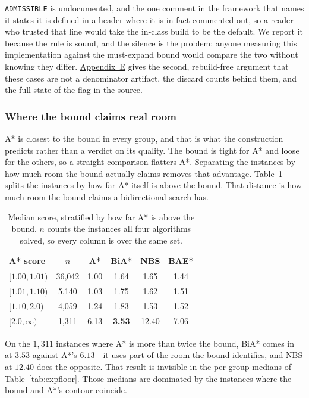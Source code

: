 \documentclass[letterpaper]{article} %
\begin{document}
\texttt{ADMISSIBLE} is undocumented, and the one comment in the framework that names it states it is defined in a header where it is in fact commented out, so a reader who trusted that line would take the in-class build to be the default. We report it because the rule is sound, and the silence is the problem: anyone measuring this implementation against the must-expand bound would compare the two without knowing they differ. \hyperref[app:e]{Appendix~E} gives the second, rebuild-free argument that these cases are not a denominator artifact, the discard counts behind them, and the full state of the flag in the source.

\subsubsection{Where the bound claims real room}
A* is closest to the bound in every group, and that is what the construction predicts rather than a verdict on its quality. The bound is tight for A* and loose for the others, so a straight comparison flatters A*. Separating the instances by how much room the bound actually claims removes that advantage. Table~\ref{tab:strat} splits the instances by how far A* itself is above the bound. That distance is how much room the bound claims a bidirectional search has.

\begin{table}[t] \centering\small \setlength{\tabcolsep}{4pt}
  \begin{tabular}{lccccc} \toprule A* score & $n$ & A* & BiA* & NBS & BAE* \\ \midrule $[1.00,1.01)$ & 36{,}042 & 1.00 & 1.64 & 1.65 & 1.44 \\ $[1.01,1.10)$ & 5{,}140 & 1.03 & 1.75 & 1.62 & 1.51 \\ $[1.10,2.0)$ & 4{,}059 & 1.24 & 1.83 & 1.53 & 1.52 \\ $[2.0,\infty)$ & 1{,}311 & 6.13 & \textbf{3.53} & 12.40 & 7.06 \\ \bottomrule
  \end{tabular}
  \caption{Median score, stratified by how far A* is above the bound. $n$ counts the instances all four algorithms solved, so every column is over the same set.}\label{tab:strat}
\end{table}

On the $1{,}311$ instances where A* is more than twice the bound, BiA* comes in at $3.53$ against A*'s $6.13$ - it uses part of the room the bound identifies, and NBS at $12.40$ does the opposite. That result is invisible in the per-group medians of Table~\ref{tab:expfloor}. Those medians are dominated by the instances where the bound and A*'s contour coincide.
\end{document}
